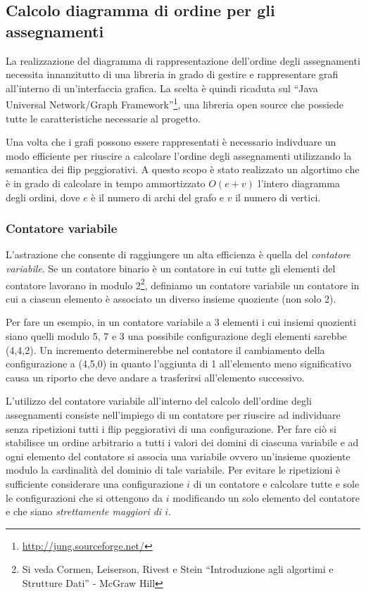 \subsection{Calcolo diagramma di ordine per gli assegnamenti}
La realizzazione del diagramma di rappresentazione dell'ordine degli assegnamenti necessita innanzitutto di una libreria in grado di gestire e
rappresentare grafi all'interno di un'interfaccia grafica. La scelta è
quindi ricaduta sul ``Java Universal Network/Graph
Framework''\footnote{\url{http://jung.sourceforge.net/}}, una libreria
open source che possiede tutte le caratteristiche necessarie al
progetto.

Una volta che i grafi possono essere rappresentati è necessario
indivduare un modo efficiente per riuscire a calcolare l'ordine degli assegnamenti utilizzando la semantica dei flip peggiorativi. A questo
scopo è stato realizzato un algortimo che è in grado di calcolare in
tempo ammortizzato $O(e + v)$ l'intero diagramma degli ordini, dove
$e$ è il numero di archi del grafo e $v$ il numero di vertici.

\subsubsection{Contatore variabile}
L'astrazione che consente di raggiungere un alta efficienza è quella
del \textit{contatore variabile}. Se un contatore binario è un
contatore in cui tutte gli elementi del contatore lavorano in modulo
2\footnote{Si veda Cormen, Leiserson, Rivest e Stein ``Introduzione
  agli algortimi e Strutture Dati'' - McGraw Hill}, definiamo un
contatore variabile un contatore in cui a ciascun elemento è associato
un diverso insieme quoziente (non solo 2).

Per fare un esempio, in un contatore variabile a 3 elementi i cui
insiemi quozienti siano quelli modulo 5, 7 e 3 una possibile
configurazione degli elementi sarebbe (4,4,2). Un incremento
determinerebbe nel contatore il cambiamento della configurazione a
(4,5,0) in quanto l'aggiunta di 1 all'elemento meno significativo
causa un riporto che deve andare a trasferirsi all'elemento
successivo.

L'utilizzo del contatore variabile all'interno del calcolo dell'ordine
degli assegnamenti consiste nell'impiego di un contatore per riuscire
ad individuare senza ripetizioni tutti i flip peggiorativi di una
configurazione. Per fare ciò si stabilisce un ordine arbitrario a
tutti i valori dei domini di ciascuna variabile e ad ogni elemento del
contatore si associa una variabile ovvero un'insieme quoziente modulo
la cardinalità del dominio di tale variabile. Per evitare le
ripetizioni è sufficiente considerare una configurazione $i$ di un
contatore e calcolare tutte e sole le configurazioni che si ottengono
da $i$ modificando un solo elemento del contatore e che siano
\textit{strettamente maggiori di $i$}.

